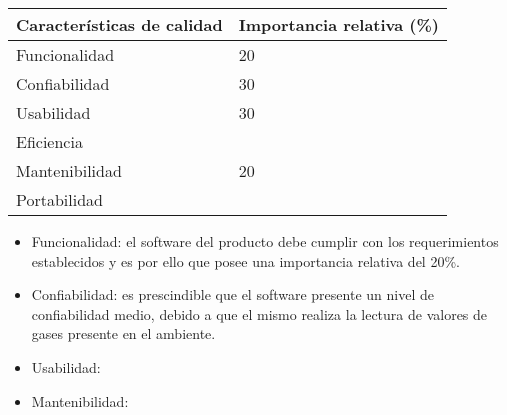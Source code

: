 \documentclass[12pt,a4paper, twosite]{article}
\begin{document}
\begin{table}[ht]
\centering
\begin{tabular}{ll}\hline \hline
 \bf Características de calidad & \bf Importancia relativa (\%)  \\ \hline \hline
 Funcionalidad & 20   \\
 Confiabilidad & 30   \\
 Usabilidad &   30    \\
 Eficiencia &		\\
 Mantenibilidad & 20    \\
 Portabilidad &  \\ \hline
\end{tabular}
\end{table}
\begin{itemize}
\item Funcionalidad: el software del producto debe cumplir con los requerimientos establecidos y es por ello que posee una importancia relativa del 20\%.

\item Confiabilidad: es prescindible que el software presente un nivel de confiabilidad medio, debido a que el mismo realiza la lectura de valores de gases presente en el ambiente. 
\item Usabilidad:
\item Mantenibilidad:
\end{itemize}
\end{document}
